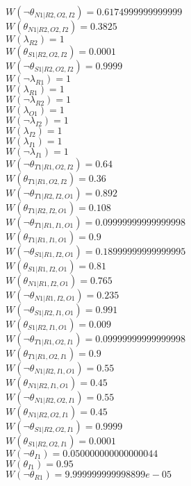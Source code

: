 $W(\neg\theta_{N1|R2,O2,I2})=0.6174999999999999$\\
$W(\theta_{N1|R2,O2,I2})=0.3825$\\
$W(\lambda_{R2})=1$\\
$W(\theta_{S1|R2,O2,I2})=0.0001$\\
$W(\neg\theta_{S1|R2,O2,I2})=0.9999$\\
$W(\neg\lambda_{R1})=1$\\
$W(\lambda_{R1})=1$\\
$W(\neg\lambda_{R2})=1$\\
$W(\lambda_{O1})=1$\\
$W(\neg\lambda_{I2})=1$\\
$W(\lambda_{I2})=1$\\
$W(\lambda_{I1})=1$\\
$W(\neg\lambda_{I1})=1$\\
$W(\neg\theta_{T1|R1,O2,I2})=0.64$\\
$W(\theta_{T1|R1,O2,I2})=0.36$\\
$W(\neg\theta_{T1|R2,I2,O1})=0.892$\\
$W(\theta_{T1|R2,I2,O1})=0.108$\\
$W(\neg\theta_{T1|R1,I1,O1})=0.09999999999999998$\\
$W(\theta_{T1|R1,I1,O1})=0.9$\\
$W(\neg\theta_{S1|R1,I2,O1})=0.18999999999999995$\\
$W(\theta_{S1|R1,I2,O1})=0.81$\\
$W(\theta_{N1|R1,I2,O1})=0.765$\\
$W(\neg\theta_{N1|R1,I2,O1})=0.235$\\
$W(\neg\theta_{S1|R2,I1,O1})=0.991$\\
$W(\theta_{S1|R2,I1,O1})=0.009$\\
$W(\neg\theta_{T1|R1,O2,I1})=0.09999999999999998$\\
$W(\theta_{T1|R1,O2,I1})=0.9$\\
$W(\neg\theta_{N1|R2,I1,O1})=0.55$\\
$W(\theta_{N1|R2,I1,O1})=0.45$\\
$W(\neg\theta_{N1|R2,O2,I1})=0.55$\\
$W(\theta_{N1|R2,O2,I1})=0.45$\\
$W(\neg\theta_{S1|R2,O2,I1})=0.9999$\\
$W(\theta_{S1|R2,O2,I1})=0.0001$\\
$W(\neg\theta_{I1})=0.050000000000000044$\\
$W(\theta_{I1})=0.95$\\
$W(\neg\theta_{R1})=9.999999999998899e-05$\\
